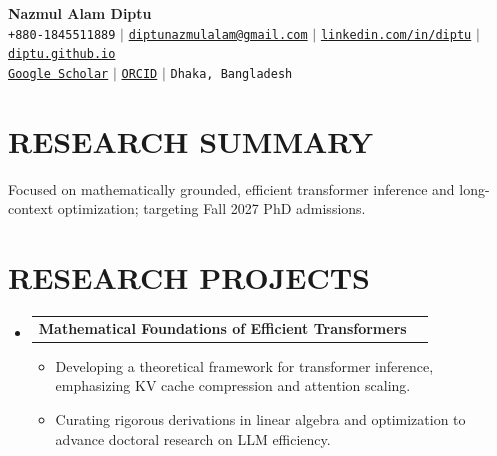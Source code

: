 \documentclass[letterpaper,11pt]{article}
\makeatletter
\newcommand{\resumeItem}[1]{
  \item\small{
    {#1 \vspace{-3pt}}
  }
}
\newcommand{\resumeProjectHeading}[2]{
    \item
    \begin{tabular*}{\textwidth}{l@{\extracolsep{\fill}}r}
      #1 & {\color{dark-grey}} \\
    \end{tabular*}\vspace{-6pt}
}
\newcommand{\resumeSubHeadingListStart}{\begin{itemize}[leftmargin=0in, label={}]}
\newcommand{\resumeSubHeadingListEnd}{\end{itemize}}
\newcommand{\resumeItemListStart}{\begin{itemize}}
\newcommand{\resumeItemListEnd}{\end{itemize}\vspace{0pt}}
\makeatother
\begin{document}
\begin{center}
    \textbf{\Huge Nazmul Alam Diptu} \\ \vspace{5pt}
    \small \faPhone* \texttt{+880-1845511889} \hspace{1pt} $|$
    \hspace{1pt} \faEnvelope \hspace{2pt} \href{mailto:diptunazmulalam@gmail.com}{\texttt{diptunazmulalam@gmail.com}} \hspace{1pt} $|$
    \hspace{1pt} \faLinkedin \hspace{2pt} \href{https://www.linkedin.com/in/diptu/}{\texttt{linkedin.com/in/diptu}} \hspace{1pt} $|$
    \hspace{1pt} \faGithub \hspace{2pt} \href{https://diptu.github.io/}{\texttt{diptu.github.io}} \\
    \faGraduationCap \hspace{2pt} \href{https://scholar.google.com/citations?user=4e8-JGgAAAAJ&hl=en}{\texttt{Google Scholar}} \hspace{1pt} $|$
    \hspace{1pt} \faOrcid \hspace{2pt} \href{https://orcid.org/0009-0003-5322-5975}{\texttt{ORCID}} \hspace{1pt} $|$
    \hspace{1pt} \faMapMarker* \hspace{2pt}\texttt{Dhaka, Bangladesh}
    \\ \vspace{-3pt}
\end{center}



\section{RESEARCH SUMMARY}

Focused on mathematically grounded, efficient transformer inference and long-context optimization; targeting Fall 2027 PhD admissions.
\section{RESEARCH PROJECTS}

\resumeSubHeadingListStart
\resumeProjectHeading
{\textbf{Mathematical Foundations of Efficient Transformers}}{}
\resumeItemListStart
\resumeItem{Developing a theoretical framework for transformer inference, emphasizing KV cache compression and attention scaling.}
\resumeItem{Curating rigorous derivations in linear algebra and optimization to advance doctoral research on LLM efficiency.}
\resumeItemListEnd
\resumeSubHeadingListEnd
\end{document}
